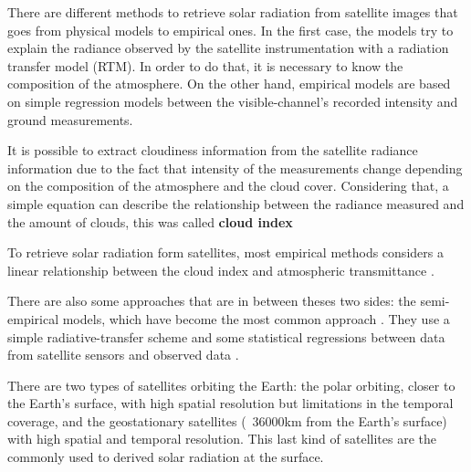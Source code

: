 There are different methods to retrieve solar radiation from satellite images that goes from physical models to empirical ones. In the first case, the models try to explain the radiance observed by the satellite instrumentation with a radiation transfer model (RTM). In order to do that, it is necessary to know the composition of the atmosphere. On the other hand, empirical models are based on simple regression models between the visible-channel's recorded intensity and ground measurements. 

It is possible to extract cloudiness information from the satellite radiance information due to the fact that intensity of the measurements change depending on the composition of the atmosphere and the cloud cover. Considering that, a simple equation can describe the relationship between the radiance measured and the amount of clouds, this was called \textbf{cloud index} \cite*{Cano1986}

To retrieve solar radiation form satellites, most empirical methods considers a linear relationship between the cloud index and atmospheric transmittance \cite*{Cano1986, Diabate1987, Ineichen1999, Zarzalejo2005, Polo2008}.  

There are also some approaches that are in between theses two sides: the semi-empirical models, which have become the most common approach \cite*{Polo2008}. They use a simple radiative-transfer scheme and some statistical regressions between data from satellite sensors and observed data \cite*{schmetz1989, pinker1995, Kleiss2013}.


There are two types of satellites orbiting the Earth: the polar orbiting, closer to the Earth's surface,  with high spatial resolution but limitations in the temporal coverage, and the geostationary satellites (~36000km from the Earth's surface) with high spatial and temporal resolution. This last kind of satellites are the commonly used to derived solar radiation at the surface.

